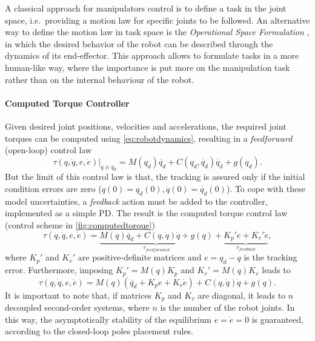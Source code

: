 A classical approach for manipulators control is to define a task in the joint space, i.e.\ providing a motion law for specific joints to be followed. An alternative way to define the motion law in task space is the \textit{Operational Space Formulation} \cite{khatib87}, in which the desired behavior of the robot can be described through the dynamics of its end-effector. This approach allows to formulate tasks in a more human-like way, where the importance is put more on the manipulation task rather than on the internal behaviour of the robot.

\paragraph{Computed Torque Controller}
Given desired joint positions, velocities and accelerations, the required joint torques can be computed using \eqref{eq:robotdynamics}, resulting in a \textit{feedforward} (open-loop) control law
\begin{equation*}
\tau(q,\dot{q},e,\dot{e})\vert_{q \equiv q_d} = M(q_d)\ddot{q_d} + C(q_d,\dot{q_d})\dot{q_d} + g(q_d).
\end{equation*}
But the limit of this control law is that, the tracking is assured only if the initial condition errors are zero ($ q(0)=q_d(0),\dot{q}(0)=\dot{q_d}(0) $). To cope with these model uncertainties, a \textit{feedback} action must be added to the controller, implemented as a simple PD. The result is the computed torque control law (control scheme in \autoref{fig:computedtorque})
\begin{equation}
\tau(q,\dot{q},e,\dot{e}) = \underbrace{M(q)\ddot{q_d} + C(q,\dot{q})\dot{q} + g(q)}_{\tau_{feedforward}} + 
\underbrace{K_p'e + K_v'\dot{e}}_{\tau_{feedback}},
\end{equation}
where $ K_p' $ and $ K_v' $ are positive-definite matrices and $ e = q_d-q $ is the tracking error.
Furthermore, imposing $ K_p' = M(q)K_p $ and $ K_v' = M(q)K_v $ leads to
\begin{equation}
\tau(q,\dot{q},e,\dot{e}) = M(q)(\ddot{q_d} + K_{p}e + K_{v}\dot{e}) + C(q,\dot{q})\dot{q} + g(q).
\end{equation}
It is important to note that, if matrices $ K_p $ and $ K_v $ are diagonal, it leads to $ n $ decoupled second-order systems, where $ n $ is the number of the robot joints. In this way, the asymptotically stability of the equilibrium $ e = \dot{e} =0 $ is guaranteed, according to the closed-loop poles placement rules.

